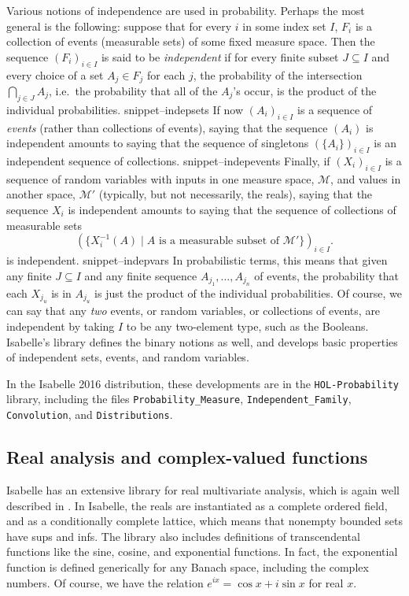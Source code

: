 \documentclass{svjour3}
\newcommand{\mdl}[1]{{\mathcal #1}} %
\newcommand{\Snippet}[1]{\csname snippet--#1\endcsname}
\begin{document}
Various notions of independence are used in probability. Perhaps the most general is the following: suppose that for every $i$ in some index set $I$, $F_i$ is a collection of events (measurable sets) of some fixed measure space. Then the sequence $(F_i)_{i \in I}$ is said to be \emph{independent} if for every finite subset $J \subseteq I$ and every choice of a set $A_j \in F_j$ for each $j$, the probability of the intersection $\bigcap_{j \in J} A_j$, i.e.~the probability that all of the $A_j$'s occur, is the product of the individual probabilities.
\Snippet{indepsets}
If now $(A_i)_{i \in I}$ is a sequence of \emph{events} (rather than collections of events), saying that the sequence $(A_i)$ is independent amounts to saying that the sequence of singletons $(\{A_i\})_{i \in I}$ is an independent sequence of collections.
\Snippet{indepevents}
Finally, if $(X_i)_{i \in I}$ is a sequence of random variables with inputs in one measure space, $\mdl M$, and values in another space, $\mdl M'$ (typically, but not necessarily, the reals), saying that the sequence $X_i$ is independent amounts to saying that the sequence of collections of measurable sets 
\[
(\{ X_i^{-1}(A) \; | \; \mbox{$A$ is a measurable subset of $\mdl M'$}\})_{i \in I}.
\]
is independent.
\Snippet{indepvars}
In probabilistic terms, this means that given any finite $J \subseteq I$ and any finite sequence $A_{j_1}, \ldots, A_{j_n}$ of events, the probability that each $X_{j_u}$ is in $A_{j_u}$ is just the product of the individual probabilities. Of course, we can say that any \emph{two} events, or random variables, or collections of events, are independent by taking $I$ to be any two-element type, such as the Booleans. Isabelle's library defines the binary notions as well, and develops basic properties of independent sets, events, and random variables.

In the Isabelle 2016 distribution, these developments are in the \texttt{HOL-Probability} library, including the files \texttt{Probability\_Measure}, \texttt{Independent\_Family}, \texttt{Convolution}, and \texttt{Distributions}.

\subsection{Real analysis and complex-valued functions}
\label{subsection:real:analysis}

Isabelle has an extensive library for real multivariate analysis, which is again well described in \cite{hoelzl:et:al:13}. In Isabelle, the reals are instantiated as a complete ordered field, and as a conditionally complete lattice, which means that nonempty bounded sets have sups and infs. The library also includes definitions of transcendental functions like the sine, cosine, and exponential functions. In fact, the exponential function is defined generically for any Banach space, including the complex numbers. Of course, we have the relation $e^{i x} = \cos x + i \sin x$ for real $x$.
\end{document}
